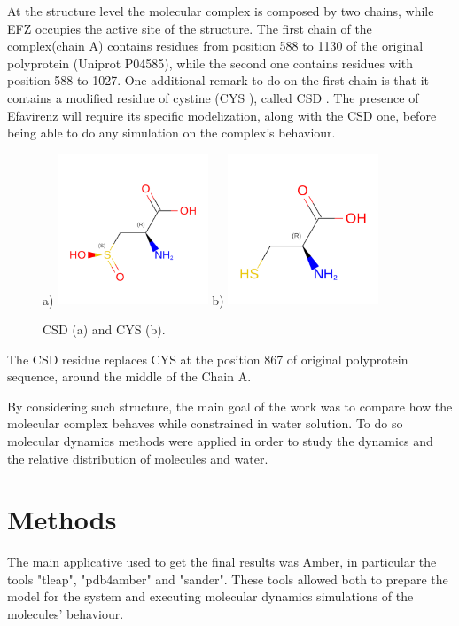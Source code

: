 \documentclass[12pt]{article}
\begin{document}
At the structure level the molecular complex is composed by two chains, while EFZ occupies the active site of the structure.
The first chain of the complex(chain A) contains residues from position 588 to 1130 of the original polyprotein (Uniprot P04585), while the second one contains residues with position 588 to 1027. One additional remark to do on the first chain is that it contains a modified residue of cystine (CYS \cite{CYS}), called CSD \cite{CSD}. The presence of Efavirenz \cite{EFZ} will require its specific modelization, along with the CSD one, before being able to do any simulation on the complex's behaviour.
\begin{figure}[H]
    \centering
    a)
    \includegraphics[width=0.4\textwidth]{../figures/CSD.png}
    b)
    \includegraphics[width=0.4\textwidth]{../figures/CYS.png}
    \caption{CSD (a) and CYS (b).\label{fig:CSDCYS}}
\end{figure}

The CSD residue replaces CYS at the position 867 of original polyprotein sequence, around the middle of the Chain A.

By considering such structure, the main goal of the work was to compare how the molecular complex behaves while constrained in water solution. To do so molecular dynamics methods were applied in order to study the dynamics and the relative distribution of molecules and water.

\section{Methods}
The main applicative used to get the final results was Amber\cite{Amber}, in particular the tools "tleap", "pdb4amber" and "sander". These tools allowed both to prepare the model for the system and executing molecular dynamics simulations of the molecules' behaviour.
\end{document}
